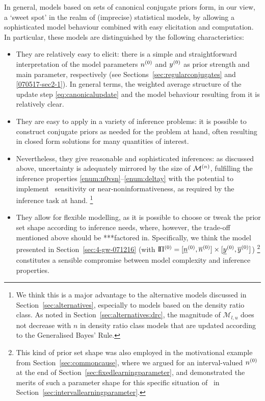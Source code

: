 In general, %
models based on sets of canonical conjugate priors form, in our view,
a `sweet spot' in the realm of (imprecise) statistical models,
by allowing a sophisticated model behaviour
combined with easy elicitation and computation.
In particular,
these models are distinguished by the following characteristics:

\begin{itemize}
\item They are relatively easy to elicit:
there is a simple and straightforward interpretation of the model parameters $n^{(0)}$ and $y^{(0)}$
as prior strength and main parameter, respectively (see Sections~\ref{sec:regularconjugates} and \ref{070517-sec2-1}).
In general terms, the weighted average structure of the update step \eqref{eq:canonicalupdate}
and the model behaviour resulting from it is relatively clear.
\item They are easy to apply in a variety of inference problems:
it is possible to construct conjugate priors as needed for the problem at hand,
often resulting in closed form solutions for many quantities of interest.
\item Nevertheless, they give reasonable and sophisticated inferences:
as discussed above, uncertainty is adequately mirrored by the size of $\mathcal{M}^{(n)}$,
fulfilling the inference properties \ref{enum:n0vsn}--\ref{enum:deltay}
with the potential to implement \pdc\ sensitivity or near-noninformativeness,
as required by the inference task at hand.%
\footnote{We think this is a major advantage to the alternative models
discussed in Section~\ref{sec:alternatives},
especially to models based on the density ratio class.
As noted in Section~\ref{sec:alternatives:drc}, the magnitude of $\mathcal{M}_{l,u}$ %
does not decrease with $n$ in density ratio class models that are updated according to the Generalised Bayes' Rule.}
\item They allow for flexible modelling, as
it is possible to choose or tweak the prior set shape according to inference needs,
where, however, the trade-off mentioned above should be ***factored in. %
Specifically, we think the model presented in Section~\ref{sec:4-gw-071216}
(with $\text{I}\!\Pi^{(0)} = [\underline{n}^{(0)}, \overline{n}^{(0)}] \times [\underline{y}^{(0)}, \overline{y}^{(0)}]$)%
\footnote{This kind of prior set shape was also employed in the motivational example
from Section~\ref{sec:commoncause}, where we argued for an interval-valued $n^{(0)}$
at the end of Section~\ref{sec:fixedlearningparameter},
and demonstrated the merits of such a parameter shape for this specific situation of \pdc\
in Section~\ref{sec:intervallearningparameter}.}
constitutes a sensible compromise between model complexity and inference properties.
\end{itemize}

